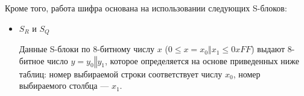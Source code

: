 \documentclass{./civarticle}
\begin{document}
Кроме того, работа шифра основана на использовании следующих S-блоков:
\begin{itemize}
    \item $S_R$ и $S_Q$
    
    Данные S-блоки по 8-битному числу $x$ ($0 \leq x = x_0 \mathbin\Vert x_1 \leq 0xFF$) выдают 8-битное число $y = y_0 \mathbin\Vert y_1$, которое определяется на основе приведенных ниже таблиц: номер выбираемой строки соответствует числу $x_0$, номер выбираемого столбца --- $x_1$.

    \begin{figure}[h!]
\end{figure}

    \begin{figure}[h!]
\end{figure}


\end{itemize}
\end{document}
